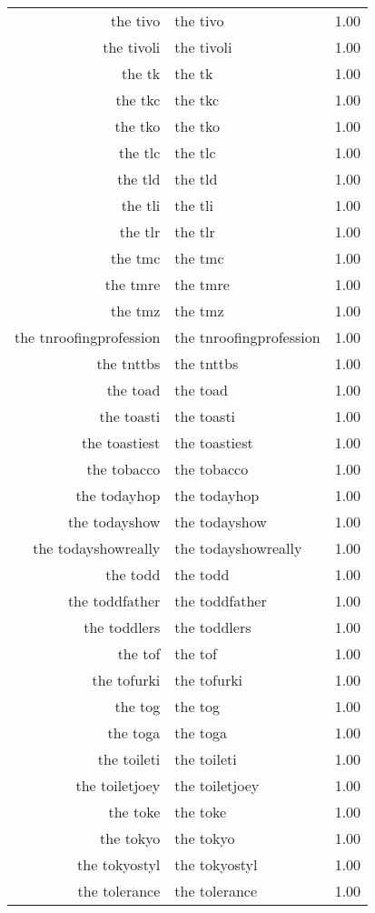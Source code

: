 \begin{table}[ht]
\begin{tabular}{rlr}
  the tivo & the tivo & 1.00 \\ 
  the tivoli & the tivoli & 1.00 \\ 
  the tk & the tk & 1.00 \\ 
  the tkc & the tkc & 1.00 \\ 
  the tko & the tko & 1.00 \\ 
  the tlc & the tlc & 1.00 \\ 
  the tld & the tld & 1.00 \\ 
  the tli & the tli & 1.00 \\ 
  the tlr & the tlr & 1.00 \\ 
  the tmc & the tmc & 1.00 \\ 
  the tmre & the tmre & 1.00 \\ 
  the tmz & the tmz & 1.00 \\ 
  the tnroofingprofession & the tnroofingprofession & 1.00 \\ 
  the tnttbs & the tnttbs & 1.00 \\ 
  the toad & the toad & 1.00 \\ 
  the toasti & the toasti & 1.00 \\ 
  the toastiest & the toastiest & 1.00 \\ 
  the tobacco & the tobacco & 1.00 \\ 
  the todayhop & the todayhop & 1.00 \\ 
  the todayshow & the todayshow & 1.00 \\ 
  the todayshowreally & the todayshowreally & 1.00 \\ 
  the todd & the todd & 1.00 \\ 
  the toddfather & the toddfather & 1.00 \\ 
  the toddlers & the toddlers & 1.00 \\ 
  the tof & the tof & 1.00 \\ 
  the tofurki & the tofurki & 1.00 \\ 
  the tog & the tog & 1.00 \\ 
  the toga & the toga & 1.00 \\ 
  the toileti & the toileti & 1.00 \\ 
  the toiletjoey & the toiletjoey & 1.00 \\ 
  the toke & the toke & 1.00 \\ 
  the tokyo & the tokyo & 1.00 \\ 
  the tokyostyl & the tokyostyl & 1.00 \\ 
  the tolerance & the tolerance & 1.00 \\ 

\end{tabular}
\end{table}
